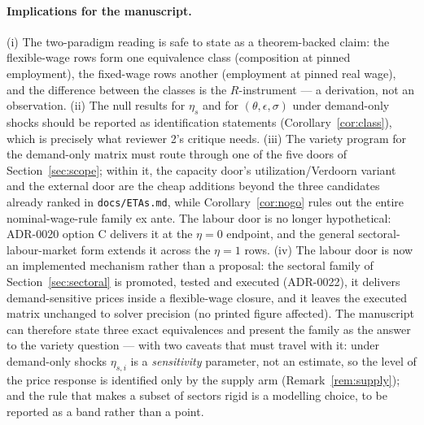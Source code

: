 \paragraph{Implications for the manuscript.} (i) The two-paradigm reading
is safe to state as a theorem-backed claim: the flexible-wage rows form one
equivalence class (composition at pinned employment), the fixed-wage rows
another (employment at pinned real wage), and the difference between the
classes is the $R$-instrument --- a derivation, not an observation.
(ii) The null results for $\eta_s$ and for $(\theta,\epsilon,\sigma)$ under
demand-only shocks should be reported as identification statements
(Corollary~\ref{cor:class}), which is precisely what reviewer 2's critique
needs. (iii) The variety program for the demand-only matrix must route
through one of the five doors of Section~\ref{sec:scope}; within it, the
capacity door's utilization/Verdoorn variant and the external door are the
cheap additions beyond the three candidates already ranked in
\texttt{docs/ETAs.md}, while Corollary~\ref{cor:nogo} rules out the entire
nominal-wage-rule family ex ante. The labour door is
no longer hypothetical: ADR-0020 option C delivers it at the $\eta = 0$
endpoint, and the general sectoral-labour-market form extends it across the
$\eta = 1$ rows.
(iv) The labour door is now an implemented mechanism
rather than a proposal: the sectoral family of Section~\ref{sec:sectoral} is
promoted, tested and executed (ADR-0022), it delivers demand-sensitive prices
inside a flexible-wage closure, and it leaves the executed matrix
unchanged to solver precision (no printed figure
affected). The manuscript can therefore state three exact equivalences and
present the family as the answer to the variety question --- with two caveats
that must travel with it: under demand-only shocks $\eta_{s,i}$ is a
\emph{sensitivity} parameter, not an estimate, so the level of the price
response is identified only by the supply arm (Remark~\ref{rem:supply}); and
the rule that makes a subset of sectors rigid is a modelling choice, to be
reported as a band rather than a point.
